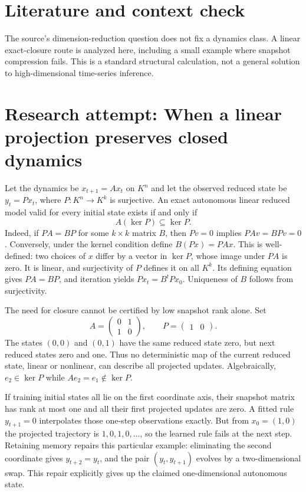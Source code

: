 \documentclass[11pt]{article}
\begin{document}
\section{Literature and context check}
The source's dimension-reduction question does not fix a dynamics class. A linear exact-closure route is analyzed here, including a small example where snapshot compression fails. This is a standard structural calculation, not a general solution to high-dimensional time-series inference.
\section{Research attempt: When a linear projection preserves closed dynamics}
Let the dynamics be $x_{t+1}=Ax_t$ on $K^n$ and let the observed reduced state be $y_t=Px_t$, where $P:K^n\to K^k$ is surjective. An exact autonomous linear reduced model valid for every initial state exists if and only if
\[
A(\ker P)\subseteq\ker P.
\]
Indeed, if $PA=BP$ for some $k\times k$ matrix $B$, then $Pv=0$ implies $PAv=BPv=0$. Conversely, under the kernel condition define $B(Px)=PAx$. This is well-defined: two choices of $x$ differ by a vector in $\ker P$, whose image under $PA$ is zero. It is linear, and surjectivity of $P$ defines it on all $K^k$. Its defining equation gives $PA=BP$, and iteration yields $Px_t=B^tPx_0$. Uniqueness of $B$ follows from surjectivity.

The need for closure cannot be certified by low snapshot rank alone. Set
\[
A=\begin{pmatrix}0&1\\1&0\end{pmatrix},\qquad P=\begin{pmatrix}1&0\end{pmatrix}.
\]
The states $(0,0)$ and $(0,1)$ have the same reduced state zero, but next reduced states zero and one. Thus no deterministic map of the current reduced state, linear or nonlinear, can describe all projected updates. Algebraically, $e_2\in\ker P$ while $Ae_2=e_1\notin\ker P$.

If training initial states all lie on the first coordinate axis, their snapshot matrix has rank at most one and all their first projected updates are zero. A fitted rule $y_{t+1}=0$ interpolates those one-step observations exactly. But from $x_0=(1,0)$ the projected trajectory is $1,0,1,0,\ldots$, so the learned rule fails at the next step. Retaining memory repairs this particular example: eliminating the second coordinate gives $y_{t+2}=y_t$, and the pair $(y_t,y_{t+1})$ evolves by a two-dimensional swap. This repair explicitly gives up the claimed one-dimensional autonomous state.
\end{document}
